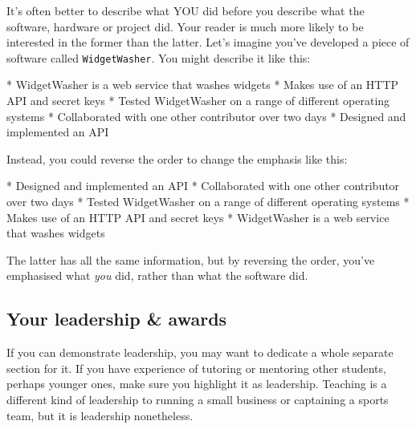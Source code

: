 \documentclass[
]{book}
\newenvironment{Shaded}{\begin{snugshade}}{\end{snugshade}}
\newcommand{\NormalTok}[1]{#1}
\newcommand{\SpecialStringTok}[1]{\textcolor[rgb]{0.31,0.60,0.02}{#1}}
\begin{document}
It's often better to describe what YOU did before you describe what the software, hardware or project did. Your reader is much more likely to be interested in the former than the latter. Let's imagine you've developed a piece of software called \texttt{WidgetWasher}. You might describe it like this:

\begin{Shaded}
\begin{Highlighting}[]
\SpecialStringTok{* }\NormalTok{WidgetWasher is a web service that washes widgets}
\SpecialStringTok{* }\NormalTok{Makes use of an HTTP API and secret keys}
\SpecialStringTok{* }\NormalTok{Tested WidgetWasher on a range of different operating systems}
\SpecialStringTok{* }\NormalTok{Collaborated with one other contributor over two days}
\SpecialStringTok{* }\NormalTok{Designed and implemented an API}
\end{Highlighting}
\end{Shaded}

Instead, you could reverse the order to change the emphasis like this:

\begin{Shaded}
\begin{Highlighting}[]
\SpecialStringTok{* }\NormalTok{Designed and implemented an API}
\SpecialStringTok{* }\NormalTok{Collaborated with one other contributor over two days}
\SpecialStringTok{* }\NormalTok{Tested WidgetWasher on a range of different operating systems}
\SpecialStringTok{* }\NormalTok{Makes use of an HTTP API and secret keys}
\SpecialStringTok{* }\NormalTok{WidgetWasher is a web service that washes widgets}
\end{Highlighting}
\end{Shaded}

The latter has all the same information, but by reversing the order, you've emphasised what \emph{you} did, rather than what the software did. 💪

\hypertarget{prizes}{%
\subsection{Your leadership \& awards}\label{prizes}}

If you can demonstrate leadership, you may want to dedicate a whole separate section for it. If you have experience of tutoring or mentoring other students, perhaps younger ones, make sure you highlight it as leadership. Teaching is a different kind of leadership to running a small business or captaining a sports team, but it is leadership nonetheless.
\end{document}
